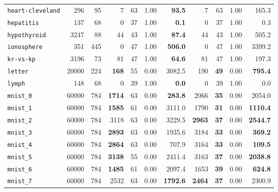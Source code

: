 \begin{tabular}{lccrrrrrrrr}
\texttt{heart-cleveland} & \multicolumn{1}{r}{296} & \multicolumn{1}{r}{95}  & 7 & 63 & 1.00 & \textbf{93.5} & 7 & 63 & 1.00 & 165.3\\
\texttt{hepatitis} & \multicolumn{1}{r}{137} & \multicolumn{1}{r}{68}  & 0 & 37 & 1.00 & \textbf{0.1} & 0 & 37 & 1.00 & 0.3\\
\texttt{hypothyroid} & \multicolumn{1}{r}{3247} & \multicolumn{1}{r}{88}  & 44 & 43 & 1.00 & \textbf{87.4} & 44 & 43 & 1.00 & 505.2\\
\texttt{ionosphere} & \multicolumn{1}{r}{351} & \multicolumn{1}{r}{445}  & 0 & 47 & 1.00 & \textbf{506.0} & 0 & 47 & 1.00 & 3399.2\\
\texttt{kr-vs-kp} & \multicolumn{1}{r}{3196} & \multicolumn{1}{r}{73}  & 81 & 47 & 1.00 & \textbf{64.6} & 81 & 47 & 1.00 & 197.3\\
\texttt{letter} & \multicolumn{1}{r}{20000} & \multicolumn{1}{r}{224}  & \textbf{168} & 55 & 0.00 & 3082.5 & 190 & \textbf{49} & 0.00 & \textbf{795.4}\\
\texttt{lymph} & \multicolumn{1}{r}{148} & \multicolumn{1}{r}{68}  & 0 & 39 & 1.00 & \textbf{0.0} & 0 & 39 & 1.00 & 0.0\\
\texttt{mnist\_0} & \multicolumn{1}{r}{60000} & \multicolumn{1}{r}{784}  & \textbf{1714} & 63 & 0.00 & \textbf{283.8} & 2066 & \textbf{35} & 0.00 & 2054.0\\
\texttt{mnist\_1} & \multicolumn{1}{r}{60000} & \multicolumn{1}{r}{784}  & \textbf{1585} & 61 & 0.00 & 3111.0 & 1790 & \textbf{31} & 0.00 & \textbf{1110.4}\\
\texttt{mnist\_2} & \multicolumn{1}{r}{60000} & \multicolumn{1}{r}{784}  & 3118 & 63 & 0.00 & 3229.5 & \textbf{2963} & \textbf{37} & 0.00 & \textbf{2544.7}\\
\texttt{mnist\_3} & \multicolumn{1}{r}{60000} & \multicolumn{1}{r}{784}  & \textbf{2893} & 63 & 0.00 & 1935.6 & 3184 & \textbf{33} & 0.00 & \textbf{369.2}\\
\texttt{mnist\_4} & \multicolumn{1}{r}{60000} & \multicolumn{1}{r}{784}  & \textbf{2864} & 63 & 0.00 & 707.9 & 3164 & \textbf{33} & 0.00 & \textbf{109.5}\\
\texttt{mnist\_5} & \multicolumn{1}{r}{60000} & \multicolumn{1}{r}{784}  & \textbf{3138} & 55 & 0.00 & 2411.4 & 3163 & \textbf{37} & 0.00 & \textbf{2038.8}\\
\texttt{mnist\_6} & \multicolumn{1}{r}{60000} & \multicolumn{1}{r}{784}  & \textbf{1485} & 61 & 0.00 & 2097.4 & 1653 & \textbf{39} & 0.00 & \textbf{624.8}\\
\texttt{mnist\_7} & \multicolumn{1}{r}{60000} & \multicolumn{1}{r}{784}  & 2532 & 63 & 0.00 & \textbf{1792.6} & \textbf{2464} & \textbf{37} & 0.00 & 2300.9\\

\end{tabular}
